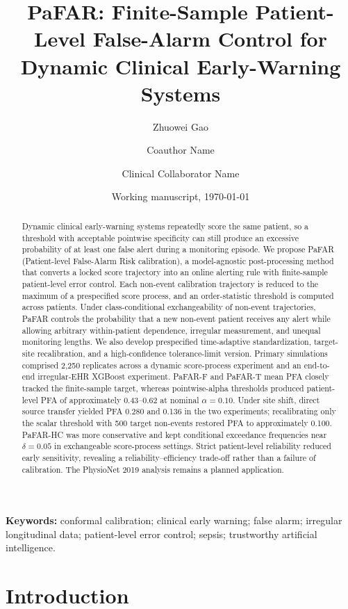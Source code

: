 \documentclass[11pt]{article}
\title{\textbf{PaFAR: Finite-Sample Patient-Level False-Alarm Control for Dynamic Clinical Early-Warning Systems}}
\author[1]{Zhuowei Gao}
\author[1]{Coauthor Name}
\author[2]{Clinical Collaborator Name}
\affil[1]{Department of Statistics, Jilin University, Changchun, China}
\affil[2]{Clinical Department and Institution, City, Country}
\date{Working manuscript, \today}
\begin{document}
\maketitle

\begin{abstract}
Dynamic clinical early-warning systems repeatedly score the same patient, so a threshold with acceptable pointwise specificity can still produce an excessive probability of at least one false alert during a monitoring episode. We propose PaFAR (Patient-level False-Alarm Risk calibration), a model-agnostic post-processing method that converts a locked score trajectory into an online alerting rule with finite-sample patient-level error control. Each non-event calibration trajectory is reduced to the maximum of a prespecified score process, and an order-statistic threshold is computed across patients. Under class-conditional exchangeability of non-event trajectories, PaFAR controls the probability that a new non-event patient receives any alert while allowing arbitrary within-patient dependence, irregular measurement, and unequal monitoring lengths. We also develop prespecified time-adaptive standardization, target-site recalibration, and a high-confidence tolerance-limit version. Primary simulations comprised 2,250 replicates across a dynamic score-process experiment and an end-to-end irregular-EHR XGBoost experiment. PaFAR-F and PaFAR-T mean PFA closely tracked the finite-sample target, whereas pointwise-alpha thresholds produced patient-level PFA of approximately 0.43--0.62 at nominal $\alpha=0.10$. Under site shift, direct source transfer yielded PFA 0.280 and 0.136 in the two experiments; recalibrating only the scalar threshold with 500 target non-events restored PFA to approximately 0.100. PaFAR-HC was more conservative and kept conditional exceedance frequencies near $\delta=0.05$ in exchangeable score-process settings. Strict patient-level reliability reduced early sensitivity, revealing a reliability--efficiency trade-off rather than a failure of calibration. The PhysioNet 2019 analysis remains a planned application.
\end{abstract}

\noindent\textbf{Keywords:} conformal calibration; clinical early warning; false alarm; irregular longitudinal data; patient-level error control; sepsis; trustworthy artificial intelligence.

\section{Introduction}
\end{document}
